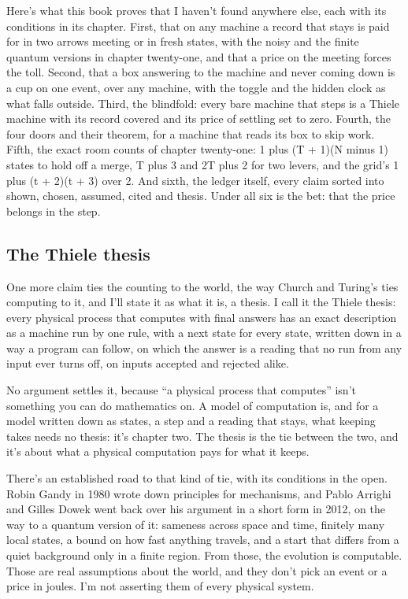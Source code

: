 \documentclass[11pt,twoside]{article}
\theoremstyle{thielethm}
\theoremstyle{thieledef}
\theoremstyle{thieledef}
\theoremstyle{thieledef}
\theoremstyle{thielethm}
\theoremstyle{thieleobs}
\theoremstyle{thielethm}
\begin{document}
Here's what this book proves that I haven't found anywhere else, each with its conditions in its chapter. First, that on any machine a record that stays is paid for in two arrows meeting or in fresh states, with the noisy and the finite quantum versions in chapter twenty-one, and that a price on the meeting forces the toll. Second, that a box answering to the machine and never coming down is a cup on one event, over any machine, with the toggle and the hidden clock as what falls outside. Third, the blindfold: every bare machine that steps is a Thiele machine with its record covered and its price of settling set to zero. Fourth, the four doors and their theorem, for a machine that reads its box to skip work. Fifth, the exact room counts of chapter twenty-one: 1 plus (T + 1)(N minus 1) states to hold off a merge, T plus 3 and 2T plus 2 for two levers, and the grid's 1 plus (t + 2)(t + 3) over 2. And sixth, the ledger itself, every claim sorted into shown, chosen, assumed, cited and thesis. Under all six is the bet: that the price belongs in the step.

\subsection{The Thiele thesis}

One more claim ties the counting to the world, the way Church and Turing's ties computing to it, and I'll state it as what it is, a thesis. I call it the Thiele thesis: every physical process that computes with final answers has an exact description as a machine run by one rule, with a next state for every state, written down in a way a program can follow, on which the answer is a reading that no run from any input ever turns off, on inputs accepted and rejected alike.

No argument settles it, because ``a physical process that computes'' isn't something you can do mathematics on. A model of computation is, and for a model written down as states, a step and a reading that stays, what keeping takes needs no thesis: it's chapter two. The thesis is the tie between the two, and it's about what a physical computation pays for what it keeps.

There's an established road to that kind of tie, with its conditions in the open. Robin Gandy in 1980 wrote down principles for mechanisms, and Pablo Arrighi and Gilles Dowek went back over his argument in a short form in 2012, on the way to a quantum version of it: sameness across space and time, finitely many local states, a bound on how fast anything travels, and a start that differs from a quiet background only in a finite region. From those, the evolution is computable. Those are real assumptions about the world, and they don't pick an event or a price in joules. I'm not asserting them of every physical system.
\end{document}
